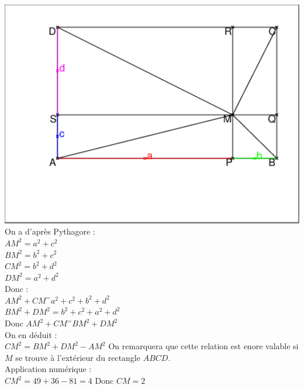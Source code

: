 \documentclass[a4paper,11pt]{book}
\begin{document}
\includegraphics[width=\textwidth]{troisrect}\\

On a d'apr\`es Pythagore :\\
$AM^2=a^2+c^2$\\
$BM^2=b^2+c^2$\\
$CM^2=b^2+d^2$\\
$DM^2=a^2+d^2$\\
Donc :\\
$AM^2+CM^=a^2+c^2+b^2+d^2$\\
$BM^2+DM^2=b^2+c^2+a^2+d^2$\\
Donc $AM^2+CM^=BM^2+DM^2$\\
On en d\'eduit :\\
$CM^2=BM^2+DM^2-AM^2$
On remarquera que cette relation est enore valable si $M$ se trouve \`a 
l'ext\'erieur du rectangle $ABCD$.\\
Application num\'erique :\\
$CM^2=49+36-81=4$
Donc $CM=2$\\
\end{document}
